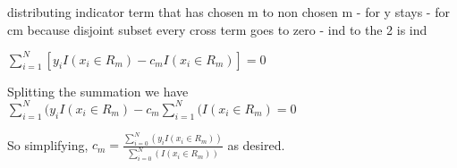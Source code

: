 \documentclass[11pt]{article}
\begin{document}
\vspace{3 mm}
\noindent
distributing indicator term that has chosen m to non chosen m - for y stays - for cm because disjoint subset every cross term goes to zero - ind to the 2 is ind

\vspace{3 mm}
\noindent
$\sum\limits_{i=1}^N [y_{i}I(x_{i} \in R_{m}) - c_{m}I(x_{i} \in R_{m})] = 0$ 

\vspace{3 mm}
\noindent
Splitting the summation we have $\sum\limits_{i=1}^N (y_{i}I(x_{i} \in R_{m}) - c_{m}\sum\limits_{i=1}^N (I(x_{i} \in R_{m}) = 0$

\vspace{3 mm}
\noindent
So simplifying, ${c}_{m} = \frac{\sum\limits_{i=0}^N (y_{i} I(x_{i} \in R_{m}))}{\sum\limits_{i=0}^N (I(x_{i} \in R_{m}))}$ as desired.
\end{document}
